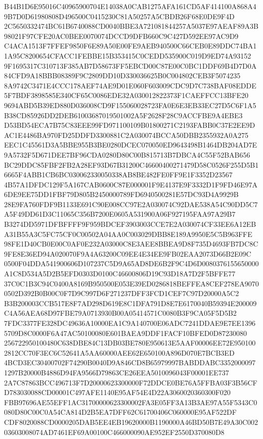 \documentclass[UTF8,fontset=fandol,zihao=-4,a4paper]{ctexart}
\begin{document}
{{B44B1D6E95016C40965900704E14038A0CAB1275AFA161CD5AF414100A868A49B7D0D61980808D496500C0415230C81A50257A5CBDB26F68E0DE9F4D
2C5650332474BC61B6740088CD0040BBE3A721081844257A5037E97AEAF89A3B98021F97CFE20AC0BEE0070074DCCD9DFB660C9C427D592EE97AC9D9
C4ACA1513F7FFEF9850F6E89A50E00FE9AEB940500C66CEB0E89DDC74BA11A95C8200654CFACC1FEBBE15B353415C0CEDD535900C019D9ED74A93152
9F1695317C310713F385AB7D58673FF5EBCD00C87E00C0BC1DDF69B4D7D0A84CFD9A18BBB08389F9C2809DD10D330036625B0C004802CEB3F5074235
8A9742C3471E4CCC178AEF74AE9D01E060F603009CDC9D7C738BAF08EDDE5F7BDF3898585E340CF65C0086EDE32A030012822373F1CAEFFCC13BFE20
9694ABD5B39ED880D036008CD9F155060028723FA0E6E3EB33EC27D5C6F1A5B38CD85926DD2DEB61003687019501002A5F2628F28C9ACCFBE9A4EBE3
D53BD54ECA7B75C83EEE99FD971100109B01800271C2193FABB0C37E2EE9DAC1E4486BA970FD25DDFD3300881C2A030074BCCA50DBB2355932A0A275
EEC1C45561D3A5BBE955B3BE0280DCEC070050ED9643498B1464DB204AD7E9A5732F5D671DEE7BF96CDA0280D80C00B815713B7DBCA4C55F52BAB656
BC29DDC85FBF2FB2A28EF93D67B31200C46600400271479D58C0526F255D5B16665F4ABB1CB6BC030062330050338AB8BE482FE0FF9E1F3352D23567
4B57A1DFDC129F5A167CAB0600C87E000001F9E4137E9F3332D1F9FD46E97A6DE9EE75DD1FBF79D805B2450000789FD6940500281E57DC93D4A9929B
28E9FA760FDF9B1133E691C90E008CC97E2A030074C92DAE538A54C90DD5C7A5F49DD61D3C11065C356B7200E0605A531900A06F927195FAA97A29B7
B3274DD5971DFBFFFF9F959BDCEF3903003CCE7E2A030074CF33EE6A12EBA31B55A3C5FC75CF0C00502A04AA0C003029DBB8E189A9950E5C5B963FFE
98FE1D40CB0E00C0AF0E232A03000C8E3AEE8BBEA9D8F735D4693FB7DC8C9FE8E36ED94A020070F9A4A63200C09EE4E34EE9FB02EAA2073D66B2E09C
0500F04DDA541900606D107237C5D9A65AD8DE6B2F9C4D6D0080376155650000A1C8D534A5D2B5EFD0303D0100C46600806D19C93D18A7D2F5BFFE77
37C0C1B3C94C0400A8169B950500E053E39ED0286818BEFFEA8CEF278EA90700502D392B0B00C0F7D9C997D6F271237DFF3FCD1CEF7C97D20000A5C2
B3B200003CCB517E8F7AD298D619E8C1DFA791D8E7E6170040B59394E200009C4A56AEA68D97FBE79A0713930B00A05414571C0080B3F9CA05F5D5B2
7FDC3377FE328DC49636A10000EA1C9A140700E06ADC7241DDAE9E7EE13965709D8C0000F6A47AC50100080E601BAEA9DDF1FACF10BFED0D87230080
256722950100480C638DBE84C13DB03BE780E950613E5AAF00006EE72E9501002812CC70F3EC6C52641A5AA60000AEE62E650100A896D070E7BCB3ED
4BCD3EC30400702F74290B0040D9A846CD8B65979997BABDDABC33520000971297B20000B4886D94FA9566D79863CE26EEA5010096043F00001EE737
2A7C87863BCC496713F7D20000623300000F72DDCE0BE76A5FFBA03F3B56CFD783030088CD00001C497AFE1140E95AF54E4D22A3060020360300F020
FBB97696AE55EFF1AC31700000623300002FA3E05FF3A13B3AE97A55F5343C0080D80C00C0A54CA814D2B5EA7DFF62C61700406C060000E95AF522DF
CDF8020088CD0000205DAB5EE4EB19620000B1190000A46BD50B7E49A30C00203603008074AD7461EF69A00100C466000090AE952EF2550D370080D8
}}
\end{document}

